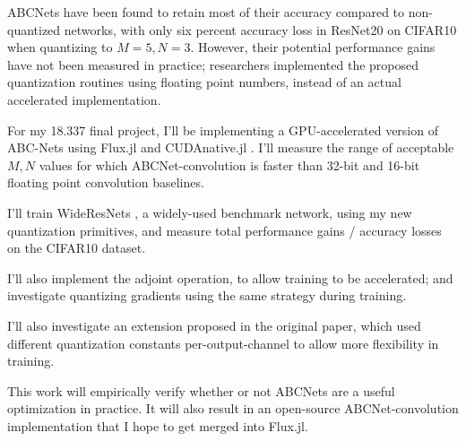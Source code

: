 \documentclass[11pt]{article}
\begin{document}
ABCNets have been found to retain most of their accuracy compared to non-quantized networks,
with only six percent accuracy loss
in ResNet20 on CIFAR10 when quantizing to \(M=5,N=3\). However, their potential performance
gains have not been measured in practice; researchers implemented the proposed quantization
routines using floating point numbers, instead of an actual accelerated implementation.

For my 18.337 final project, I'll be implementing a GPU-accelerated version of ABC-Nets
using Flux.jl and CUDAnative.jl \citep{FluxJL}\citep{CUDAnativeJL}. I'll measure the
range of acceptable \(M,N\) values for which ABCNet-convolution is faster than
32-bit and 16-bit floating point convolution baselines.

I'll train WideResNets \citep{WideResNets}, a widely-used benchmark network,
using my new quantization primitives, and measure total performance gains / accuracy losses
on the CIFAR10 dataset.

I'll also implement the adjoint operation, to allow training to be accelerated;
and investigate quantizing gradients using the same strategy during training.

I'll also investigate an extension proposed in the original paper, which used different
quantization constants per-output-channel to allow more flexibility in training.

This work will empirically verify whether or not ABCNets are a useful optimization in
practice. It will also result in an open-source ABCNet-convolution implementation that
I hope to get merged into Flux.jl.








\end{document}
